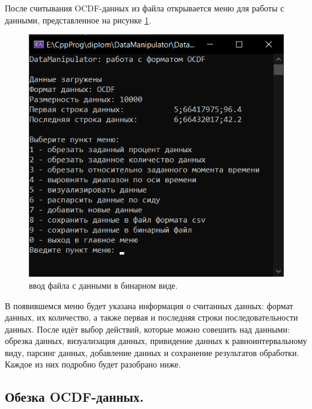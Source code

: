 {\standartFont

  \par После считывания OCDF-данных из файла открывается меню для работы с данными, представленное на рисунке \ref{fig:OCDFmenu}.

  \begin{figure}[H]
    \centering
    \includegraphics{images/forDataManipulator/OCDFmenu.png}
    \caption{ввод файла с данными в бинарном виде.} 
    \label{fig:OCDFmenu}
  \end{figure}

  \par В появившемся меню будет указана информация о считанных данных: формат данных, их количество, а также первая и последняя строки последовательности данных. После идёт выбор действий, которые можно совешить над данными: обрезка данных, визуализация данных, привидение данных к равноинтервальному виду, парсинг данных, добавление данных и сохранение результатов обработки. Каждое из них подробно будет разобрано ниже.

  \par
}

\subsection{ \standartTitleFont
  Обезка OCDF-данных. 
} \label{subsec:OCDFCut}

